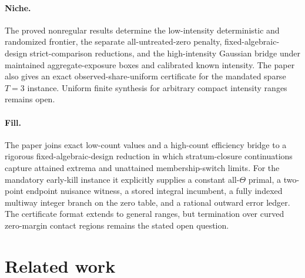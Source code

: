 \documentclass{article}
\begin{document}
\paragraph{Niche.} The proved nonregular results determine the low-intensity deterministic and randomized frontier, the separate all-untreated-zero penalty, fixed-algebraic-design strict-comparison reductions, and the high-intensity Gaussian bridge under maintained aggregate-exposure boxes and calibrated known intensity. The paper also gives an exact observed-share-uniform certificate for the mandated sparse \(T=3\) instance. Uniform finite synthesis for arbitrary compact intensity ranges remains open.

\paragraph{Fill.} The paper joins exact low-count values and a high-count efficiency bridge to a rigorous fixed-algebraic-design reduction in which stratum-closure continuations capture attained extrema and unattained membership-switch limits. For the mandatory early-kill instance it explicitly supplies a constant all-\(\Theta\) primal, a two-point endpoint nuisance witness, a stored integral incumbent, a fully indexed multiway integer branch on the zero table, and a rational outward error ledger. The certificate format extends to general ranges, but termination over curved zero-margin contact regions remains the stated open question.

\section{Related work}
\end{document}
